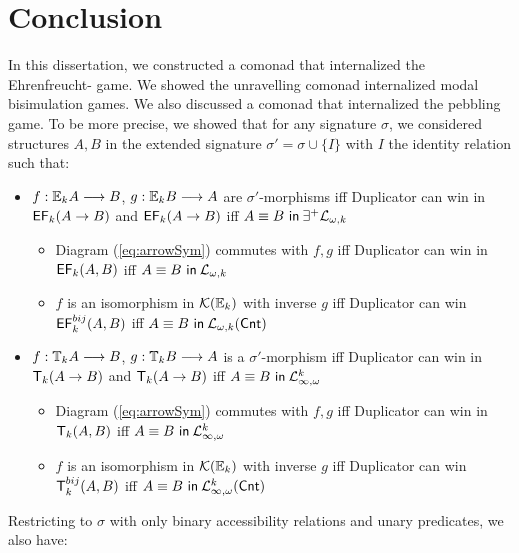 \chapter{Conclusion}
In this dissertation, we constructed a comonad that internalized the Ehrenfreucht-{\Fraisse} game. We showed the unravelling comonad internalized modal bisimulation games. We also discussed a comonad that internalized the pebbling game. To be more precise, we showed that for any signature $\sigma$, we considered structures $A,B$ in the extended signature $\sigma' = \sigma \cup \{I\}$ with $I$ the identity relation such that: 
\begin{itemize}
\item $f:{\mathbb{E}_{k}A} \longrightarrow B$, $g:{\mathbb{E}_{k}B} \longrightarrow A$ are $\sigma'$-morphisms iff Duplicator can win in ${\mathsf{EF}_{k}(A \rightarrow B)}$ and ${\mathsf{EF}_{k}(A \rightarrow B)}$ iff ${A \equiv B \ \mathsf{in}\: \exists^{+}\mathcal{L}_{\omega,k}}$
    \begin{itemize}
        \item Diagram (\ref{eq:arrowSym}) commutes with $f,g$ iff Duplicator can win in ${\mathsf{EF}_{k}(A,B)}$ iff ${A \equiv B \ \mathsf{in}\: \mathcal{L}_{\omega,k}}$
        \item $f$ is an isomorphism in $\mathcal{K}({\mathbb{E}_{k}})$ with inverse $g$ iff Duplicator can win ${\mathsf{EF}^{bij}_{k}(A,B)}$ iff ${A \equiv B \ \mathsf{in}\: \mathcal{L}_{\omega,k}(\mathsf{Cnt})}$
    \end{itemize}
\item $f:{\mathbb{T}_{k}A} \longrightarrow B$, $g:{\mathbb{T}_{k}B} \longrightarrow A$ is a $\sigma'$-morphism iff Duplicator can win in ${\mathsf{T}_{k}(A \rightarrow B)}$ and ${\mathsf{T}_{k}(A \rightarrow B)}$ iff ${A \equiv B \ \mathsf{in}\: \mathcal{L}^{k}_{\infty,\omega}}$
    \begin{itemize}
        \item Diagram (\ref{eq:arrowSym}) commutes with $f,g$ iff Duplicator can win in ${\mathsf{T}_{k}(A,B)}$ iff ${A \equiv B \ \mathsf{in}\: \mathcal{L}^{k}_{\infty,\omega}}$
        \item $f$ is an isomorphism in $\mathcal{K}({\mathbb{E}_{k}})$ with inverse $g$ iff Duplicator can win ${\mathsf{T}^{bij}_{k}(A,B)}$ iff ${A \equiv B \ \mathsf{in}\: \mathcal{L}^{k}_{\infty,\omega}(\mathsf{Cnt})}$
    \end{itemize}
\end{itemize}
Restricting to $\sigma$ with only binary accessibility relations and unary predicates, we also have: 
